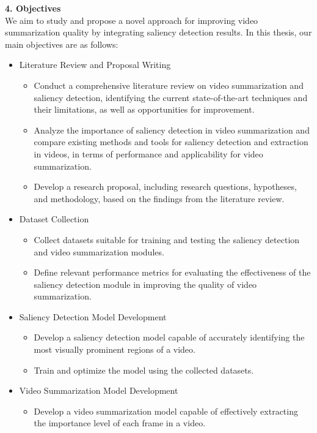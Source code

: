 \documentclass[14pt]{extarticle}
\begin{document}
    \vspace{.5cm}
    \textbf{4. Objectives} \\
    We aim to study and propose a novel approach for improving video summarization quality by integrating saliency detection results.
    In this thesis, our main objectives are as follows:
    \begin{itemize} 
        \item Literature Review and Proposal Writing
        \begin{itemize}
            \item Conduct a comprehensive literature review on video summarization and saliency detection, identifying the current state-of-the-art techniques and their limitations, as well as opportunities for improvement. 
            \item Analyze the importance of saliency detection in video summarization and compare existing methods and tools for saliency detection and extraction in videos, in terms of performance and applicability for video summarization.
            \item Develop a research proposal, including research questions, hypotheses, and methodology, based on the findings from the literature review.
        \end{itemize}
        \item Dataset Collection
        \begin{itemize}
            \item Collect datasets suitable for training and testing the saliency detection and video summarization modules. 
            \item Define relevant performance metrics for evaluating the effectiveness of the saliency detection module in improving the quality of video summarization.
        \end{itemize}
        \item Saliency Detection Model Development
        \begin{itemize}
            \item Develop a saliency detection model capable of accurately identifying the most visually prominent regions of a video.
            \item Train and optimize the model using the collected datasets.
        \end{itemize}
        \item Video Summarization Model Development
        \begin{itemize}
            \item Develop a video summarization model capable of effectively extracting the importance level of each frame in a video.

\end{itemize}
\end{itemize}
\end{document}

